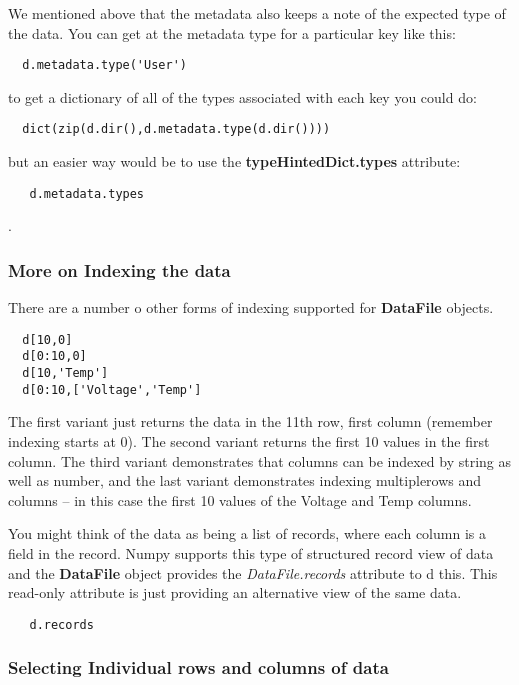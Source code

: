 \documentclass[a4paper,11pt]{scrartcl}
\begin{document}
We mentioned above that the metadata also keeps a note of the expected type of
the data. You can get at the metadata type for a particular key like this:
\begin{lstlisting}
  d.metadata.type('User')
\end{lstlisting}
to get a dictionary of all of the types associated with each key you could do:
\begin{lstlisting}
  dict(zip(d.dir(),d.metadata.type(d.dir())))
\end{lstlisting}
but an easier way would be to use the \textbf{typeHintedDict.types} attribute:
\begin{lstlisting}
   d.metadata.types
\end{lstlisting}
.

\subsubsection{More on Indexing the data}

There are a number o other forms of indexing supported for \textbf{DataFile}
objects.

\begin{lstlisting}
  d[10,0]
  d[0:10,0]
  d[10,'Temp']
  d[0:10,['Voltage','Temp']
\end{lstlisting}

The first variant just returns the data in the 11th row, first column (remember
indexing starts at 0). The second variant returns the first 10 values in the
first column. The third variant demonstrates that columns can be indexed by
string as well as number, and the last variant demonstrates indexing
multiplerows and columns -- in this case the first 10 values of the Voltage and
Temp columns.

You might think of the data as being a list of records, where each column is a
field in the record. Numpy supports this type of structured record view of data
and the \textbf{DataFile} object provides the \textit{DataFile.records}
attribute to d this. This read-only attribute is just providing an alternative
view of the same data.

\begin{lstlisting}
   d.records
\end{lstlisting}

\subsubsection{Selecting Individual rows and columns of data}
\end{document}
